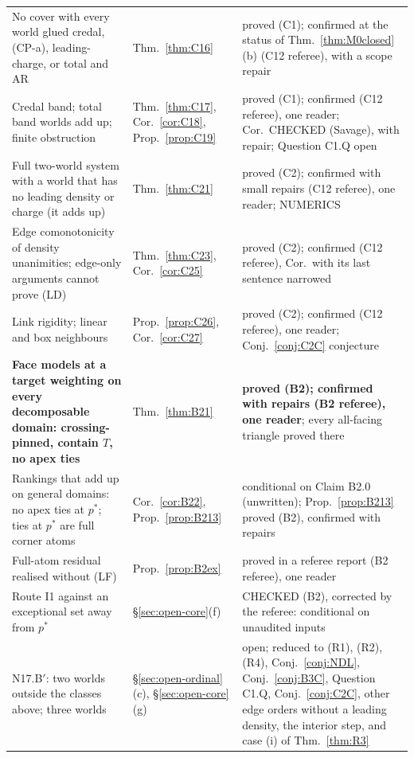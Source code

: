 \documentclass[11pt]{article}
\theoremstyle{definition}
\theoremstyle{remark}
\begin{document}
{\begin{longtable}{>{\raggedright\arraybackslash}p{6.4cm}>{\raggedright\arraybackslash}p{2.1cm}>{\raggedright\arraybackslash}p{5.6cm}}
No cover with every world glued credal, (CP-a), leading-charge, or total and AR & Thm.~\ref{thm:C16} & proved (C1); confirmed at the status of Thm.~\ref{thm:M0closed}(b) (C12 referee), with a scope repair\\
Credal band; total band worlds add up; finite obstruction & Thm.~\ref{thm:C17}, Cor.~\ref{cor:C18}, Prop.~\ref{prop:C19} & proved (C1); confirmed (C12 referee), one reader; Cor.\ CHECKED (Savage), with repair; Question C1.Q open\\
Full two-world system with a world that has no leading density or charge (it adds up) & Thm.~\ref{thm:C21} & proved (C2); confirmed with small repairs (C12 referee), one reader; NUMERICS\\
Edge comonotonicity of density unanimities; edge-only arguments cannot prove (LD) & Thm.~\ref{thm:C23}, Cor.~\ref{cor:C25} & proved (C2); confirmed (C12 referee), Cor.\ with its last sentence narrowed\\
Link rigidity; linear and box neighbours & Prop.~\ref{prop:C26}, Cor.~\ref{cor:C27} & proved (C2); confirmed (C12 referee), one reader; Conj.~\ref{conj:C2C} conjecture\\
\textbf{Face models at a target weighting on every decomposable domain: crossing-pinned, contain $T$, no apex ties} & Thm.~\ref{thm:B21} & \textbf{proved (B2); confirmed with repairs (B2 referee), one reader}; every all-facing triangle proved there\\
Rankings that add up on general domains: no apex ties at $p^*$; ties at $p^*$ are full corner atoms & Cor.~\ref{cor:B22}, Prop.~\ref{prop:B213} & conditional on Claim B2.0 (unwritten); Prop.~\ref{prop:B213} proved (B2), confirmed with repairs\\
Full-atom residual realised without (LF) & Prop.~\ref{prop:B2ex} & proved in a referee report (B2 referee), one reader\\
Route I1 against an exceptional set away from $p^*$ & \S\ref{sec:open-core}(f) & CHECKED (B2), corrected by the referee: conditional on unaudited inputs\\
N17.B$'$: two worlds outside the classes above; three worlds & \S\ref{sec:open-ordinal}(c), \S\ref{sec:open-core}(g) & open; reduced to (R1), (R2), (R4), Conj.~\ref{conj:NDL}, Conj.~\ref{conj:B3C}, Question C1.Q, Conj.~\ref{conj:C2C}, other edge orders without a leading density, the interior step, and case (i) of Thm.~\ref{thm:R3}\\


\end{longtable}}
\end{document}
